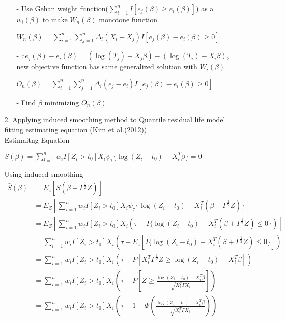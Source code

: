 \documentclass[12pt]{article}
\begin{document}
\begin{itemize}
\begin{itemize}
\begin{itemize}
					\item[-] Use Gehan weight function($\sum_{i=1}^{n}I[e_{j}(\beta)\ge e_{i}(\beta)]$) as a $w_{i}(\beta)$ to make $W_{n}(\beta)$ monotone function\\
						\begin{center}
						$W_{n}(\beta)=\sum_{i=1}^{n}\sum_{j=1}^{n}\Delta_{i}(X_{i}-X_{j})I[e_{j}(\beta)-e_{i}(\beta)\ge 0]$
						\end{center}
					\item[-] $\because e_{j}(\beta)-e_{i}(\beta)=(\log(T_j)-X_j\beta)-(\log(T_i)-X_i\beta)$, new objective function has same generalized solution with $W_{i}(\beta)$\\
						\begin{center}
						$O_{n}(\beta)=\sum_{i=1}^{n}\sum_{j=1}^{n}\Delta_{i}(e_j-e_i)I[e_{j}(\beta)-e_{i}(\beta)\ge 0]$
						\end{center}
					\item[-] Find $\beta$ minimizing $O_{n}(\beta)$
				\end{itemize}
		\newpage
		\item[2.]Applying induced smoothing method to Quantile residual life model fitting estimating equation (Kim et al.(2012))\\
		Estimaitng Equation\\
		\begin{center}
			$S(\beta)=\sum_{i=1}^{n}w_i I[Z_i>t_0]X_i \psi_\tau\{\log(Z_i - t_0)-X_i^T\beta\}=0$
		\end{center}
		Using induced smoothing\\
		\begin{align*}
			\bar{S}(\beta) & =E_z[S(\beta+\Gamma^\frac{1}{2}Z)]\\
			&=E_Z[\sum_{i=1}^{n}w_i I[Z_i>t_0]X_i \psi_\tau\{\log(Z_i - t_0)-X_i^T(\beta+\Gamma^\frac{1}{2}Z)\}]\\
			&=E_Z[\sum_{i=1}^{n}w_i I[Z_i>t_0]X_i (\tau-I\{\log(Z_i - t_0)-X_i^T(\beta+\Gamma^\frac{1}{2}Z)\le0\})]\\
			&=\sum_{i=1}^{n}w_i I[Z_i>t_0]X_i (\tau-E_z[I\{\log(Z_i - t_0)-X_i^T(\beta+\Gamma^\frac{1}{2}Z)\le0\}])\\
			&=\sum_{i=1}^{n}w_i I[Z_i>t_0]X_i (\tau-P[X_i^T\Gamma^\frac{1}{2} Z \ge \log(Z_i-t_0)-X_i^T\beta])\\			&=\sum_{i=1}^{n}w_i I[Z_i>t_0]X_i (\tau-P[Z \ge \frac{\log(Z_i-t_0)-X_i^T\beta}{\sqrt{X_i^T\Gamma X_i}}])\\
			&=\sum_{i=1}^{n}w_i I[Z_i>t_0]X_i (\tau-1+\Phi(\frac{\log(Z_i-t_0)-X_i^T\beta}{\sqrt{X_i^T\Gamma X_i}}))		
		\end{align*}
			
			
		
		
		\end{itemize}
	\end{itemize}
\end{document}
